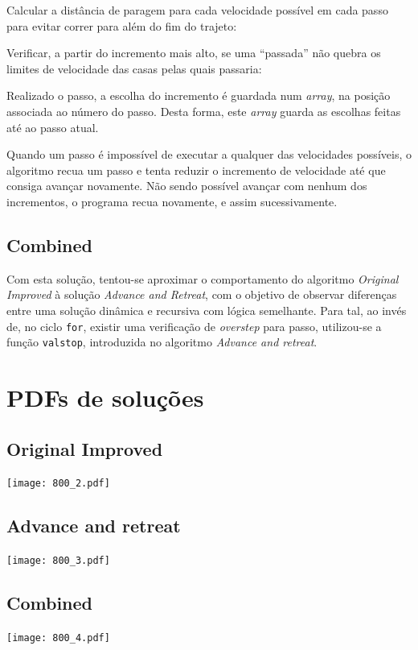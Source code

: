 \documentclass[portuguese,11pt,a4paper,titlepage]{article}
\newcommand{\foreign}[1]{\textit{#1}}
\newcommand{\srcdir}{..}
\begin{document}
Calcular a distância de paragem para cada velocidade possível em cada passo para evitar correr para além do fim do
trajeto:


Verificar, a partir do incremento mais alto, se uma ``passada'' não  quebra
os limites de velocidade das casas pelas quais passaria:


Realizado o passo, a escolha do incremento é guardada num \foreign{array},
na posição associada ao número do passo. Desta forma, este \foreign{array}
guarda as escolhas feitas até ao passo atual.

Quando um passo é impossível de executar a qualquer das velocidades possíveis,
o algoritmo recua um passo e tenta reduzir o incremento de velocidade até que
consiga avançar novamente. Não sendo possível avançar com nenhum dos incrementos,
o programa recua novamente, e assim sucessivamente.

\subsection{Combined}
Com esta solução, tentou-se aproximar o comportamento do algoritmo
\foreign{Original Improved} à solução \foreign{Advance and Retreat}, com o
objetivo de observar diferenças entre uma solução dinâmica e recursiva com
lógica semelhante.
Para tal, ao invés de, no ciclo \verb#for#, existir uma verificação de
\foreign{overstep} para passo, utilizou-se a função \verb#valstop#, introduzida no algoritmo \foreign{Advance and retreat}.

\pagebreak

\section{PDFs de soluções}
\subsection{Original Improved}
\texttt{[image: 800\_2.pdf]}
\subsection{Advance and retreat}
\texttt{[image: 800\_3.pdf]}
\subsection{Combined}
\texttt{[image: 800\_4.pdf]}
\pagebreak
\end{document}
